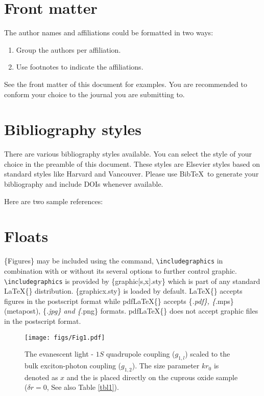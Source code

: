 \documentclass[]{elsarticle} %
\begin{document}
\section{Front matter}

The author names and affiliations could be formatted in two ways:

\begin{enumerate}[(1)]
\item Group the authors per affiliation.
\item Use footnotes to indicate the affiliations.
\end{enumerate}

See the front matter of this document for examples. You are recommended
to conform your choice to the journal you are submitting to.

\section{Bibliography styles}

There are various bibliography styles available. You can select the
style of your choice in the preamble of this document. These styles are
Elsevier styles based on standard styles like Harvard and Vancouver.
Please use Bib\TeX~to generate your bibliography and include DOIs
whenever available.

Here are two sample references: \cite{Fortunato2010}
\cite{Fortunato2010,NewmanGirvan2004}
\cite{Fortunato2010,Vehlowetal2013}

\section{Floats}

\{Figures\} may be included using the command,\linebreak 
\verb+\includegraphics+ in combination with or without its several
options to further control graphic. \verb+\includegraphics+ is provided
by \{graphic{[}s,x{]}.sty\} which is part of any standard \LaTeX\{\}
distribution. \{graphicx.sty\} is loaded by default. \LaTeX\{\} accepts
figures in the postscript format while pdf\LaTeX\{\} accepts
\{\emph{.pdf\}, \{}.mps\} (metapost), \{\emph{.jpg\} and \{}.png\}
formats. pdf\LaTeX\{\} does not accept graphic files in the postscript
format.

\begin{figure}
    \centering
        \texttt{[image: figs/Fig1.pdf]}
    \caption{The evanescent light - $1S$ quadrupole coupling
    ($g_{1,l}$) scaled to the bulk exciton-photon coupling
    ($g_{1,2}$). The size parameter $kr_{0}$ is denoted as $x$ and
    the \PMS is placed directly on the cuprous oxide sample ($\delta
    r=0$, See also Table \protect\ref{tbl1}).}
    \label{FIG:1}
\end{figure}
\end{document}
